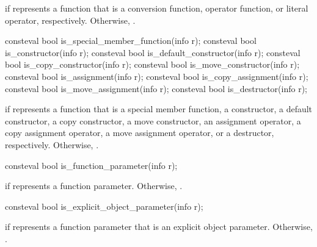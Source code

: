 \begin{itemdescr}
\pnum
\returns
{} if  represents a function that is a
conversion function,
operator function, or
literal operator, respectively.
Otherwise, .
\end{itemdescr}

%
%
%
%
%
%
%
%
%
\begin{itemdecl}
consteval bool is_special_member_function(info r);
consteval bool is_constructor(info r);
consteval bool is_default_constructor(info r);
consteval bool is_copy_constructor(info r);
consteval bool is_move_constructor(info r);
consteval bool is_assignment(info r);
consteval bool is_copy_assignment(info r);
consteval bool is_move_assignment(info r);
consteval bool is_destructor(info r);
\end{itemdecl}

\begin{itemdescr}
\pnum
\returns
{} if  represents a function that is a
special member function,
a constructor,
a default constructor,
a copy constructor,
a move constructor,
an assignment operator,
a copy assignment operator,
a move assignment operator, or
a destructor, respectively.
Otherwise, .
\end{itemdescr}

%
\begin{itemdecl}
consteval bool is_function_parameter(info r);
\end{itemdecl}

\begin{itemdescr}
\pnum
\returns
{} if  represents a function parameter.
Otherwise, .
\end{itemdescr}

%
\begin{itemdecl}
consteval bool is_explicit_object_parameter(info r);
\end{itemdecl}

\begin{itemdescr}
\pnum
\returns
{} if  represents a function parameter
that is an explicit object parameter.
Otherwise, .
\end{itemdescr}

